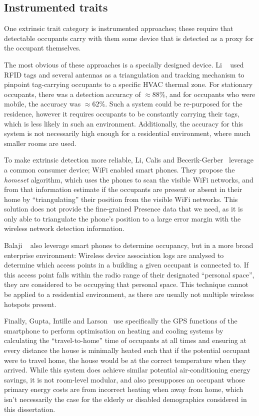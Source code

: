 \documentclass[../thesis/thesis.tex]{subfiles}
\begin{document}
\subsection{Instrumented traits}
\label{subsubsec:litreview:sensors:extrinsic:instrumented}
One extrinsic trait category is instrumented approaches; these require that detectable occupants carry with them some device that is detected as a proxy for the occupant themselves.

The most obvious of these approaches is a specially designed device. Li \etal~\cite{li2012measuring} used RFID tags and several antennas as a triangulation and tracking mechanism to pinpoint tag-carrying occupants to a specific HVAC thermal zone. For stationary occupants, there was a detection accuracy of $\approx88\%$, and for occupants who were mobile, the accuracy was $\approx62\%$. Such a system could be re-purposed for the residence, however it requires occupants to be constantly carrying their tags, which is less likely in such an environment. Additionally, the accuracy for this system is not necessarily high enough for a residential environment, where much smaller rooms are used.

To make extrinsic detection more reliable, Li, Calis and Becerik-Gerber~\cite{kleiminger2013inferring} leverage a common consumer device; WiFi enabled smart phones. They propose the \textit{homeset} algorithm, which uses the phones to scan the visible WiFi networks, and from that information estimate if the occupants are present or absent in their home by ``triangulating'' their position from the visible WiFi networks. This solution does not provide the fine-grained Presence data that we need, as it is only able to triangulate the phone's position to a large error margin with the wireless network detection information.

Balaji \etal~\cite{balaji2013sentinel} also leverage smart phones to determine occupancy, but in a more broad enterprise environment: Wireless device association logs are analysed to determine which access points in a building a given occupant is connected to. If this access point falls within the radio range of their designated ``personal space'', they are considered to be occupying that personal space. This technique cannot be applied to a residential environment, as there are usually not multiple wireless hotspots present.

Finally, Gupta, Intille and Larson~\cite{gupta2009adding} use specifically the GPS functions of the smartphone to perform optimisation on heating and cooling systems by calculating the ``travel-to-home'' time of occupants at all times and ensuring at every distance the house is minimally heated such that if the potential occupant were to travel home, the house would be at the correct temperature when they arrived. While this system does achieve similar potential air-conditioning energy savings, it is not room-level modular, and also presupposes an occupant whose primary energy costs are from incorrect heating when away from home, which isn't necessarily the case for the elderly or disabled demographics considered in this dissertation.
\end{document}
